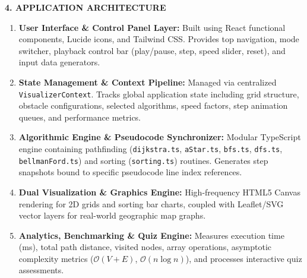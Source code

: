 \documentclass[12pt, a4paper]{article}
\begin{document}
\newpage

\setcounter{page}{6}

\begin{center}
    {\Large \textbf{4. APPLICATION ARCHITECTURE}}
\end{center}
\vspace{0.4cm}

\begin{enumerate}[leftmargin=2em, itemsep=10pt]
    \item \textbf{User Interface & Control Panel Layer:} Built using React functional components, Lucide icons, and Tailwind CSS. Provides top navigation, mode switcher, playback control bar (play/pause, step, speed slider, reset), and input data generators.
    
    \item \textbf{State Management & Context Pipeline:} Managed via centralized \texttt{VisualizerContext}. Tracks global application state including grid structure, obstacle configurations, selected algorithms, speed factors, step animation queues, and performance metrics.
    
    \item \textbf{Algorithmic Engine & Pseudocode Synchronizer:} Modular TypeScript engine containing pathfinding (\texttt{dijkstra.ts}, \texttt{aStar.ts}, \texttt{bfs.ts}, \texttt{dfs.ts}, \texttt{bellmanFord.ts}) and sorting (\texttt{sorting.ts}) routines. Generates step snapshots bound to specific pseudocode line index references.
    
    \item \textbf{Dual Visualization & Graphics Engine:} High-frequency HTML5 Canvas rendering for 2D grids and sorting bar charts, coupled with Leaflet/SVG vector layers for real-world geographic map graphs.
    
    \item \textbf{Analytics, Benchmarking & Quiz Engine:} Measures execution time (ms), total path distance, visited nodes, array operations, asymptotic complexity metrics ($\mathcal{O}(V+E)$, $\mathcal{O}(n \log n)$), and processes interactive quiz assessments.
\end{enumerate}

\newpage

\setcounter{page}{7}
\end{document}
